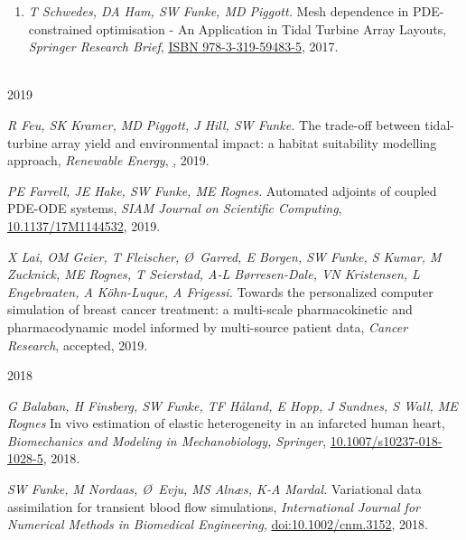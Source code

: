 \documentclass[11pt]{article}
\begin{document}
\newpage
{}
\begin{enumerate}
    \item \textit{T Schwedes, DA Ham, SW Funke,  MD Piggott.} Mesh dependence in PDE-constrained optimisation - An Application in Tidal Turbine Array Layouts, \textit{Springer Research Brief}, \href{https://www.springer.com/de/book/9783319594828}{ISBN 978-3-319-59483-5}, 2017.
\end{enumerate}

\\
2019
\begin{etaremune}
\setcounter{enumi}{21}
  \item \textit{R Feu, SK Kramer, MD Piggott, J Hill, SW Funke.} The trade-off between tidal-turbine array yield and environmental impact: a habitat suitability modelling approach, \textit{Renewable Energy}, \href{https://doi.org/10.1016/j.renene.2019.04.141}, 2019.
  \item \textit{PE Farrell, JE Hake, SW Funke, ME Rognes.} Automated adjoints of coupled PDE-ODE systems, \textit{SIAM Journal on Scientific Computing}, \href{https://doi.org/10.1137/17M1144532}{10.1137/17M1144532}, 2019.
  \item \textit{X Lai, OM Geier, T Fleischer, \O~Garred, E Borgen, SW Funke, S Kumar, M Zucknick, ME Rognes, T Seierstad, A-L B{\o}rresen-Dale, VN Kristensen, L Engebraaten, A K{\"o}hn-Luque, A Frigessi.} Towards the personalized computer simulation of breast cancer treatment: a multi-scale pharmacokinetic and pharmacodynamic model informed by multi-source patient data, \textit{Cancer Research}, accepted, 2019.
\end{etaremune}
2018
\begin{etaremune}
\setcounter{enumi}{18}
    \item \textit{G Balaban, H Finsberg, SW Funke, TF H\r{a}land, E Hopp, J Sundnes, S Wall, ME Rognes} In vivo estimation of elastic heterogeneity in an infarcted human heart, \textit{Biomechanics and Modeling in Mechanobiology, Springer}, \href{https://doi.org/10.1007/s10237-018-1028-5}{10.1007/s10237-018-1028-5}, 2018.
    \item \textit{SW Funke, M Nordaas, \O~Evju, MS Aln{\ae}s, K-A Mardal.} Variational data assimilation for transient blood flow simulations, \textit{International Journal for Numerical Methods in Biomedical Engineering}, \href{https://doi.org/10.1002/cnm.3152}{doi:10.1002/cnm.3152}, 2018.
\end{etaremune}
\end{document}
